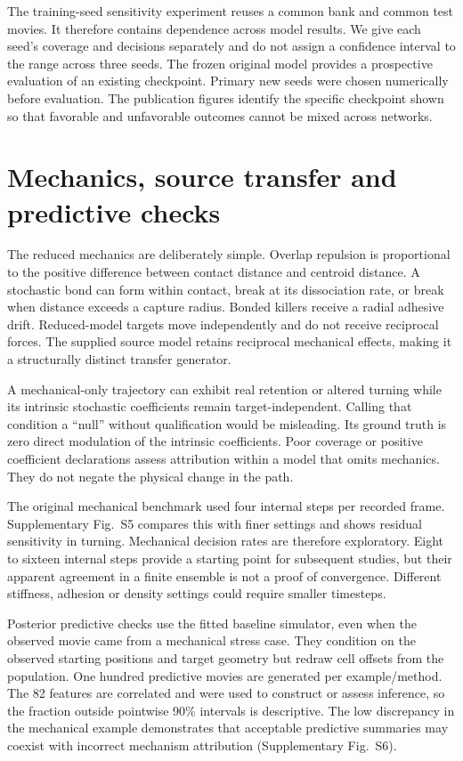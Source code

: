 \documentclass[11pt]{article}
\begin{document}
The training-seed sensitivity experiment reuses a common bank and common test movies. It therefore contains dependence across model results. We give each seed's coverage and decisions separately and do not assign a confidence interval to the range across three seeds. The frozen original model provides a prospective evaluation of an existing checkpoint. Primary new seeds were chosen numerically before evaluation. The publication figures identify the specific checkpoint shown so that favorable and unfavorable outcomes cannot be mixed across networks.

\section{Mechanics, source transfer and predictive checks}
The reduced mechanics are deliberately simple. Overlap repulsion is proportional to the positive difference between contact distance and centroid distance. A stochastic bond can form within contact, break at its dissociation rate, or break when distance exceeds a capture radius. Bonded killers receive a radial adhesive drift. Reduced-model targets move independently and do not receive reciprocal forces. The supplied source model retains reciprocal mechanical effects, making it a structurally distinct transfer generator.

A mechanical-only trajectory can exhibit real retention or altered turning while its intrinsic stochastic coefficients remain target-independent. Calling that condition a ``null'' without qualification would be misleading. Its ground truth is zero direct modulation of the intrinsic coefficients. Poor coverage or positive coefficient declarations assess attribution within a model that omits mechanics. They do not negate the physical change in the path.

The original mechanical benchmark used four internal steps per recorded frame. Supplementary Fig.~S5 compares this with finer settings and shows residual sensitivity in turning. Mechanical decision rates are therefore exploratory. Eight to sixteen internal steps provide a starting point for subsequent studies, but their apparent agreement in a finite ensemble is not a proof of convergence. Different stiffness, adhesion or density settings could require smaller timesteps.

Posterior predictive checks use the fitted baseline simulator, even when the observed movie came from a mechanical stress case. They condition on the observed starting positions and target geometry but redraw cell offsets from the population. One hundred predictive movies are generated per example/method. The 82 features are correlated and were used to construct or assess inference, so the fraction outside pointwise 90\% intervals is descriptive. The low discrepancy in the mechanical example demonstrates that acceptable predictive summaries may coexist with incorrect mechanism attribution (Supplementary Fig.~S6).
\end{document}
